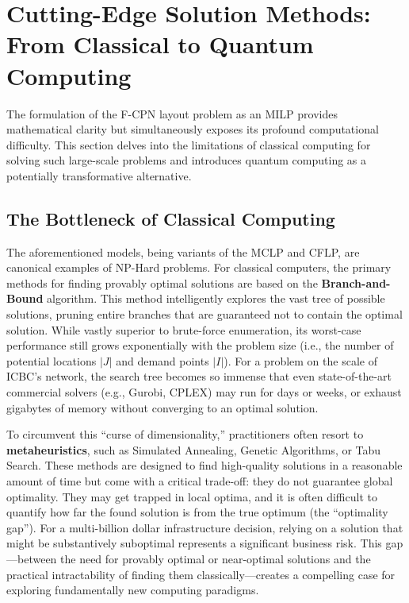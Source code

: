\documentclass[11pt,a4paper]{article}
\begin{document}
\section{Cutting-Edge Solution Methods: From Classical to Quantum Computing}

The formulation of the F-CPN layout problem as an MILP provides mathematical clarity but simultaneously exposes its profound computational difficulty. This section delves into the limitations of classical computing for solving such large-scale problems and introduces quantum computing as a potentially transformative alternative.

\subsection{The Bottleneck of Classical Computing}

The aforementioned models, being variants of the MCLP and CFLP, are canonical examples of NP-Hard problems. For classical computers, the primary methods for finding provably optimal solutions are based on the \textbf{Branch-and-Bound} algorithm. This method intelligently explores the vast tree of possible solutions, pruning entire branches that are guaranteed not to contain the optimal solution. While vastly superior to brute-force enumeration, its worst-case performance still grows exponentially with the problem size (i.e., the number of potential locations $|J|$ and demand points $|I|$). For a problem on the scale of ICBC's network, the search tree becomes so immense that even state-of-the-art commercial solvers (e.g., Gurobi, CPLEX) may run for days or weeks, or exhaust gigabytes of memory without converging to an optimal solution.

To circumvent this ``curse of dimensionality,'' practitioners often resort to \textbf{metaheuristics}, such as Simulated Annealing, Genetic Algorithms, or Tabu Search. These methods are designed to find high-quality solutions in a reasonable amount of time but come with a critical trade-off: they do not guarantee global optimality. They may get trapped in local optima, and it is often difficult to quantify how far the found solution is from the true optimum (the ``optimality gap''). For a multi-billion dollar infrastructure decision, relying on a solution that might be substantively suboptimal represents a significant business risk. This gap---between the need for provably optimal or near-optimal solutions and the practical intractability of finding them classically---creates a compelling case for exploring fundamentally new computing paradigms.
\end{document}
